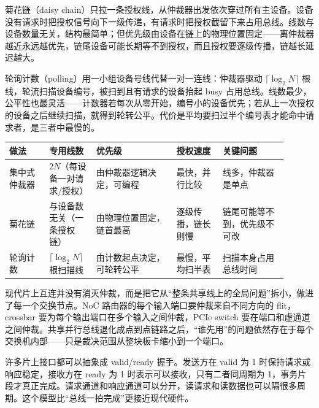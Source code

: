 菊花链（daisy chain）只拉一条授权线，从仲裁器出发依次穿过所有主设备。设备没有请求时把授权信号向下一级传递，有请求时把授权截留下来占用总线。线数与设备数量无关，结构最简单；但优先级由设备在链上的物理位置固定——离仲裁器越近永远越优先，链尾设备可能长期等不到授权，而且授权要逐级传播，链越长延迟越大。

轮询计数（polling）用一小组设备号线代替一对一连线：仲裁器驱动 $\lceil\log_2 N\rceil$ 根线，轮流扫描设备编号，被扫到且有请求的设备抬起 busy 占用总线。线数最少，公平性也最灵活——计数器若每次从零开始，编号小的设备优先；若从上一次授权的设备之后继续扫描，就得到轮转公平。代价是平均要扫过半个编号表才能命中请求者，是三者中最慢的。

\begin{longtable}{L{0.13\linewidth}L{0.15\linewidth}L{0.26\linewidth}L{0.15\linewidth}L{0.21\linewidth}}
\toprule
做法 & 专用线数 & 优先级 & 授权速度 & 关键问题 \\
\midrule
集中式仲裁器 & $2N$（每设备一对请求/授权） & 由仲裁器逻辑决定，可编程 & 最快，并行比较 & 线多，仲裁器是单点 \\\tablerowrule
菊花链 & 与设备数无关（一条授权链） & 由物理位置固定，链首最高 & 逐级传播，链长则慢 & 链尾可能等不到，优先级不可改 \\\tablerowrule
轮询计数 & $\lceil\log_2 N\rceil$ 根扫描线 & 由计数起点决定，可轮转公平 & 最慢，平均扫半表 & 扫描本身占用总线时间 \\
\bottomrule
\end{longtable}

现代片上互连并没有消灭仲裁，而是把它从“整条共享线上的全局问题”拆小，做进了每一个交换节点。NoC 路由器的每个输入端口要仲裁来自不同方向的 flit，crossbar 要为每个输出端口在多个输入之间仲裁，PCIe switch 要在端口和虚通道之间仲裁。共享并行总线退化成点到点链路之后，“谁先用”的问题依然存在于每个交换机内部——只是裁决范围从整块板卡缩小到一个端口。

许多片上接口都可以抽象成 valid/ready 握手。发送方在 valid 为 1 时保持请求或响应稳定，接收方在 ready 为 1 时表示可以接收，只有二者同周期为 1，事务片段才真正完成。请求通道和响应通道可以分开，读请求和读数据也可以隔很多周期。这个模型比“总线一拍完成”更接近现代硬件。

